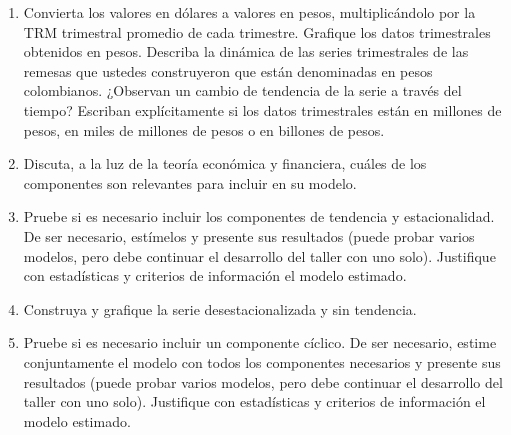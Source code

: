 \documentclass{article}
\theoremstyle{remark}
\theoremstyle{definition}
\begin{document}
\begin{enumerate}[label=\emph{\alph*})]
    \item {Convierta los valores en d\'olares a valores en pesos, multiplic\'andolo por la TRM trimestral promedio de cada trimestre. Grafique los datos trimestrales obtenidos en pesos. Describa la din\'amica de las series trimestrales de las remesas que ustedes construyeron que est\'an denominadas en pesos colombianos. ¿Observan un cambio de tendencia de la serie a trav\'es del tiempo? Escriban expl\'icitamente si los datos trimestrales est\'an en millones de pesos, en miles de millones de pesos o en billones de pesos.}
        \begin{tcolorbox}[title=Soluci\'on 3.a]
            
        \end{tcolorbox}
    \item {Discuta, a la luz de la teor\'ia econ\'omica y financiera, cu\'ales de los componentes son relevantes para incluir en su modelo.}
        \begin{tcolorbox}[title=Soluci\'on 3.b]
            
        \end{tcolorbox}
    \item {Pruebe si es necesario incluir los componentes de tendencia y estacionalidad. De ser necesario, est\'imelos y presente sus resultados (puede probar varios modelos, pero debe continuar el desarrollo del taller con uno solo). Justifique con estad\'isticas y criterios de informaci\'on el modelo estimado.}
        \begin{tcolorbox}[title=Soluci\'on 3.c]
            
        \end{tcolorbox}
    \item {Construya y grafique la serie desestacionalizada y sin tendencia.}
        \begin{tcolorbox}[title=Soluci\'on 3.d]
            
        \end{tcolorbox}
    \item {Pruebe si es necesario incluir un componente c\'iclico. De ser necesario, estime conjuntamente el modelo con todos los componentes necesarios y presente sus resultados (puede probar varios modelos, pero debe continuar el desarrollo del taller con uno solo). Justifique con estad\'isticas y criterios de informaci\'on el modelo estimado.}
        \begin{tcolorbox}[title=Soluci\'on 3.e]
            

\end{tcolorbox}
\end{enumerate}
\end{document}
